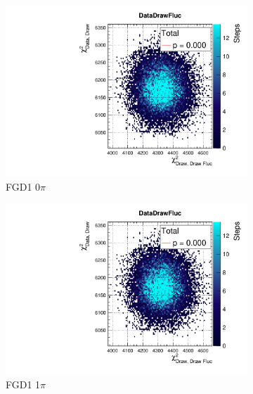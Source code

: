 \begin{figure}[h]
	\begin{subfigure}[t]{0.32\textwidth}
		\includegraphics[width=\textwidth, trim={20mm 6mm 4mm 11mm}, clip,page=7]{figures/mach3/2018/data/2018a_FixedCov_RedCov_Mpi_Data_merge_PostPredStore_FullLLH_procs}
		\caption{FGD1 0$\pi$}
	\end{subfigure}
	\begin{subfigure}[t]{0.32\textwidth}
		\includegraphics[width=\textwidth, trim={20mm 6mm 4mm 11mm}, clip,page=16]{figures/mach3/2018/data/2018a_FixedCov_RedCov_Mpi_Data_merge_PostPredStore_FullLLH_procs}
		\caption{FGD1 1$\pi$}
	\end{subfigure}
	\begin{subfigure}[t]{0.32\textwidth}

\end{subfigure}
\end{figure}

